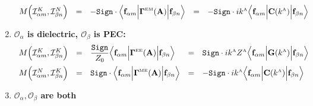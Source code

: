 \documentclass[dvips,letterpaper]{article}
\begin{document}
\begin{enumerate}
$$\begin{array}{lclcl}
 M\Big( \mathcal{I}^K_{\alpha m}, \mathcal{I}^N_{\beta n} \Big) 
  &=&
  \displaystyle{ -\texttt{Sign}\cdot
                 \Big\langle 
                 \mathbf{f}_{\alpha m} 
                 \Big| \boldsymbol{\Gamma}^{\hbox{\tiny{EM}}}(\mathbf{A}) \Big|
                 \mathbf{f}_{\beta n} 
                 \Big\rangle
               }
  &=&
  \displaystyle{ -\texttt{Sign}\cdot ik^{\hbox{\tiny{A}}}
                  \Big\langle 
                  \mathbf{f}_{\alpha m} 
                  \Big| \mathbf{C}(k^{\hbox{\tiny{A}}})\Big|
                  \mathbf{f}_{\beta n} 
                  \Big\rangle
               }
\end{array}$$
\item \textbf{ $\mathcal{O}_\alpha$ is dielectric, 
               $\mathcal{O}_\beta$ is PEC:}
$$\begin{array}{lclcl}
 M\Big( \mathcal{I}^K_{\alpha m}, \mathcal{I}^K_{\beta n} \Big) 
  &=& 
  \displaystyle{ \frac{\texttt{Sign}}{Z_0} 
                 \Big\langle \mathbf{f}_{\alpha m} 
                 \Big| \boldsymbol{\Gamma}^{\hbox{\tiny{EE}}}(\mathbf{A}) \Big|
                 \mathbf{f}_{\beta n} 
                 \Big\rangle
               }
  &=&
  \displaystyle{ \texttt{Sign}\cdot ik^{\hbox{\tiny{A}}} Z^{\hbox{\tiny{A}}}
                 \Big\langle \mathbf{f}_{\alpha m} 
                 \Big| \mathbf{G}(k^{\hbox{\tiny{A}}}) \Big|
                 \mathbf{f}_{\beta n} 
                 \Big\rangle
               }
\\[10pt]
 M\Big( \mathcal{I}^N_{\alpha m}, \mathcal{I}^K_{\beta n} \Big) 
  &=&
  \displaystyle{ \texttt{Sign}\cdot
                 \Big\langle 
                 \mathbf{f}_{\alpha m} 
                 \Big| \boldsymbol{\Gamma}^{\hbox{\tiny{ME}}}(\mathbf{A}) \Big|
                 \mathbf{f}_{\beta n} 
                 \Big\rangle
               }
  &=&
  \displaystyle{ -\texttt{Sign}\cdot ik^{\hbox{\tiny{A}}}
                  \Big\langle 
                  \mathbf{f}_{\alpha m} 
                  \Big| \mathbf{C}(k^{\hbox{\tiny{A}}})\Big|
                  \mathbf{f}_{\beta n} 
                  \Big\rangle
               }
\end{array}$$
\item \textbf{ $\mathcal{O}_\alpha, \mathcal{O}_\beta$ are both
}
\end{enumerate}
\end{document}
